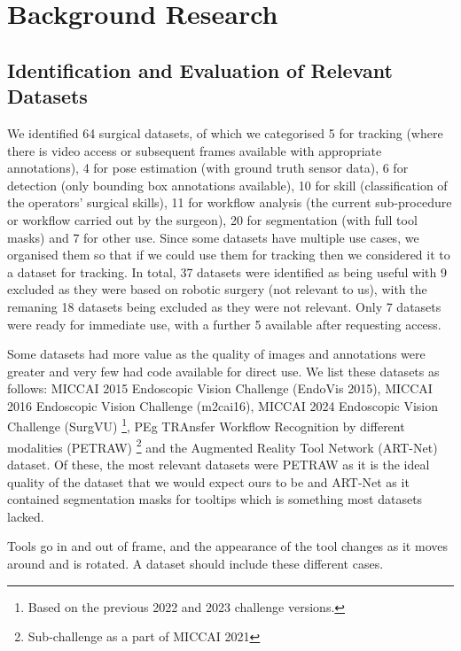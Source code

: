 \section{Background Research}

\subsection{Identification and Evaluation of Relevant Datasets}


We identified 64 surgical datasets, of which we categorised 5 for tracking (where there is video access or subsequent frames available with appropriate annotations), 4 for pose estimation (with ground truth sensor data), 6 for detection (only bounding box annotations available), 10 for skill (classification of the operators' surgical skills), 11 for workflow analysis (the current sub-procedure or workflow carried out by the surgeon), 20 for segmentation (with full tool masks) and 7 for other use. Since some datasets have multiple use cases, we organised them so that if we could use them for tracking then we considered it to a dataset for tracking. In total, 37 datasets were identified as being useful with 9 excluded as they were based on robotic surgery (not relevant to us), with the remaning 18 datasets being excluded as they were not relevant. Only 7 datasets were ready for immediate use, with a further 5 available after requesting access.

Some datasets had more value as the quality of images and annotations were greater and very few had code available for direct use. We list these datasets as follows: MICCAI 2015 Endoscopic Vision Challenge (EndoVis 2015), MICCAI 2016 Endoscopic Vision Challenge (m2cai16), MICCAI 2024 Endoscopic Vision Challenge (SurgVU) \footnote{Based on the previous 2022 and 2023 challenge versions.}, PEg TRAnsfer Workflow Recognition by different modalities (PETRAW) \footnote{Sub-challenge as a part of MICCAI 2021} and the Augmented Reality Tool Network (ART-Net) dataset. Of these, the most relevant datasets were PETRAW as it is the ideal quality of the dataset that we would expect ours to be and ART-Net as it contained segmentation masks for tooltips which is something most datasets lacked.

Tools go in and out of frame, and the appearance of the tool changes as it moves around and is rotated. A dataset should include these different cases.

